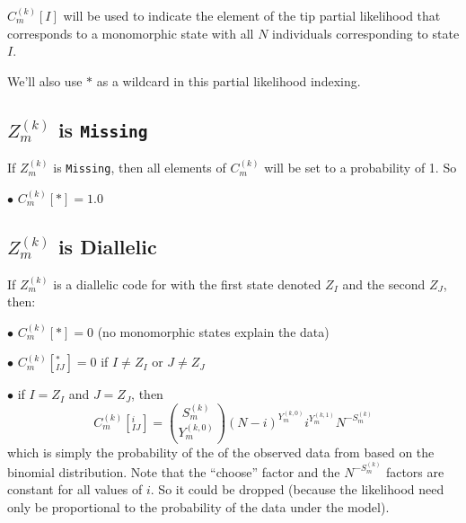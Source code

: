 \documentclass{llncs}
\newcommand{\virtPopSize}{\ensuremath{N}}
\begin{document}
$C_m^{(k)}[I]$ will be used to indicate the element of 
    the tip partial likelihood that corresponds to a monomorphic state with all $\virtPopSize$
    individuals corresponding to state $I$.

We'll also use $\ast$ as a wildcard in this partial likelihood indexing.

\subsection*{$Z_m^{(k)}$ is \texttt{Missing}}
If $Z_m^{(k)}$ is \texttt{Missing}, then all elements of $C_m^{(k)}$ will be set to a probability of 1. So
\begin{compactitem}
    \item[$\bullet$] $C_m^{(k)}[\ast]=1.0$
\end{compactitem}

\subsection*{$Z_m^{(k)}$ is Diallelic}
If $Z_m^{(k)}$ is a diallelic code for with the first state denoted $Z_I$ and the second $Z_J$, then:
\begin{compactitem}
    \item[$\bullet$] $C_m^{(k)}[*] = 0$  (no monomorphic states explain the data)
    \item[$\bullet$] $C_m^{(k)}[^{\ast}_{IJ}] = 0$  if $I\neq Z_I$ or $J\neq Z_J$
    \item[$\bullet$] if $I = Z_I$ and $J = Z_J$, then
     $$C_m^{(k)}[^{i}_{IJ}] = {S_m^{(k)} \choose Y_m^{(k,0)}} (\virtPopSize - i)^{Y_m^{(k,0)}}i^{Y_m^{(k,1)}} \virtPopSize^{-S_m^{(k)}}$$
     which is simply the probability of the of the observed data from based on the binomial distribution.
     Note that the ``choose'' factor and the $ \virtPopSize^{-S_m^{(k)}}$ factors are constant for all values of $i$. So it could be dropped (because the likelihood need only be proportional to the probability of the data under the model).
\end{compactitem}
\end{document}
